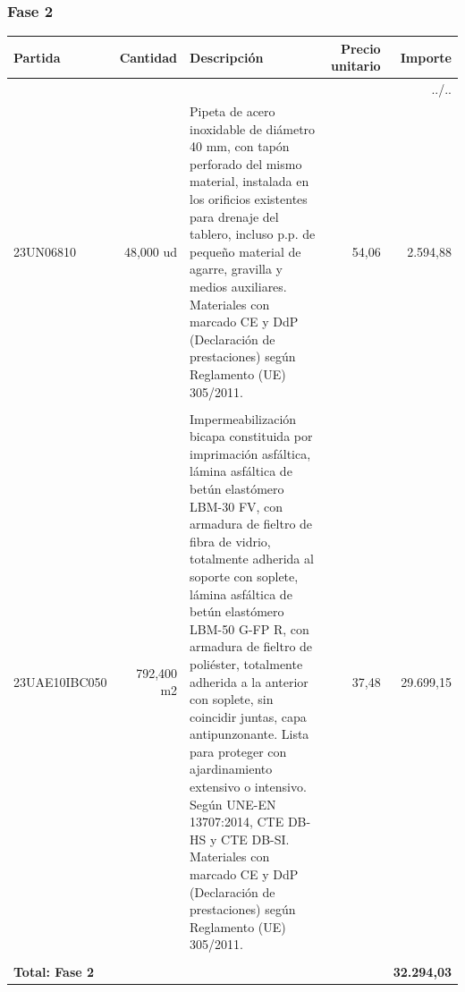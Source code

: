 \documentclass{book}%
\begin{document}
\normalsize

%
\subsubsection{Fase 2}%
\small%
\begin{longtable}{lrlrr}%
Partida&Cantidad&Descripción&\multicolumn{1}{p{1.5cm}}{Precio unitario}&Importe\\%
\hline%
\endhead%
\multicolumn{5}{r}{../..}\\%
\endfoot%
\hline%
\endlastfoot%
23UN06810&    48,000 ud&\multicolumn{1}{p{5cm}}{Pipeta de acero inoxidable de diámetro 40 mm, con tapón perforado del mismo material, instalada en los orificios existentes para drenaje del tablero, incluso p.p. de pequeño material de agarre, gravilla y medios auxiliares. Materiales con marcado CE y DdP (Declaración de prestaciones) según Reglamento (UE) 305/2011.}&     54,06&2.594,88\\%
&&&&\\%
23UAE10IBC050&   792,400 m2&\multicolumn{1}{p{5cm}}{Impermeabilización bicapa constituida por imprimación asfáltica, lámina asfáltica de betún elastómero LBM{-}30 FV, con armadura de fieltro de fibra de vidrio, totalmente adherida al soporte con soplete, lámina asfáltica de betún elastómero LBM{-}50 G{-}FP R, con armadura de fieltro de poliéster, totalmente adherida a la anterior con soplete, sin coincidir juntas, capa antipunzonante. Lista para proteger con ajardinamiento extensivo o intensivo. Según UNE{-}EN 13707:2014, CTE DB{-}HS y CTE DB{-}SI. Materiales con marcado CE y DdP (Declaración de prestaciones) según Reglamento (UE) 305/2011.}&     37,48&29.699,15\\%
&&&&\\%
\multicolumn{4}{p{8cm}}{\textbf{Total: Fase 2}}&\textbf{32.294,03}\\%
\end{longtable}%
\normalsize

%
\end{document}
